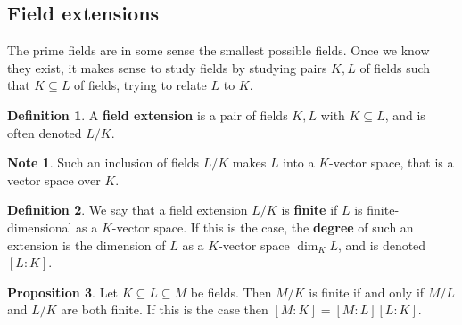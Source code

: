 \documentclass{article}
\renewcommand{\sb}[1]{\left[ #1 \right]}
\theoremstyle{definition}\newtheorem{definition}{Definition}[subsection]
\theoremstyle{definition}\newtheorem{remark}[definition]{Remark}
\theoremstyle{definition}\newtheorem*{example}{Example}
\theoremstyle{definition}\newtheorem*{note}{Note}
\newtheorem{proposition}[definition]{Proposition}
\begin{document}
\subsection{Field extensions}

The prime fields are in some sense the smallest possible fields. Once we know they exist, it makes sense to study fields by studying pairs $ K, L $ of fields such that $ K \subseteq L $ of fields, trying to relate $ L $ to $ K $.

\begin{definition}
A \textbf{field extension} is a pair of fields $ K, L $ with $ K \subseteq L $, and is often denoted $ L / K $.
\end{definition}

\begin{note}
Such an inclusion of fields $ L / K $ makes $ L $ into a $ K $-vector space, that is a vector space over $ K $.
\end{note}

\begin{definition}
We say that a field extension $ L / K $ is \textbf{finite} if $ L $ is finite-dimensional as a $ K $-vector space. If this is the case, the \textbf{degree} of such an extension is the dimension of $ L $ as a $ K $-vector space $ \dim_KL $, and is denoted $ \sb{L : K} $.
\end{definition}

\begin{proposition}
Let $ K \subseteq L \subseteq M $ be fields. Then $ M / K $ is finite if and only if $ M / L $ and $ L / K $ are both finite. If this is the case then $ \sb{M : K} = \sb{M : L}\sb{L : K} $.
\end{proposition}
\end{document}
